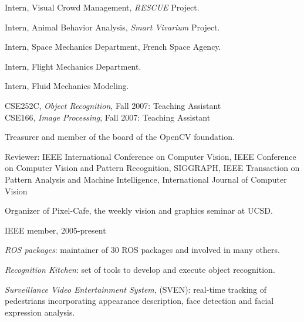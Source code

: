 \begin{llist}
Intern, Visual Crowd Management, {\em RESCUE} Project.

Intern, Animal Behavior Analysis, {\em Smart Vivarium} Project.

Intern, Space Mechanics Department, French Space Agency.

 
Intern, Flight Mechanics Department.

 
Intern, Fluid Mechanics Modeling.

CSE252C, {\em Object Recognition}, Fall 2007: Teaching Assistant\\
CSE166, {\em Image Processing}, Fall 2007: Teaching Assistant


Treasurer and member of the board of the OpenCV foundation.

Reviewer: IEEE International Conference on Computer Vision, IEEE Conference on Computer Vision and Pattern Recognition, 
SIGGRAPH, IEEE Transaction on Pattern Analysis and Machine Intelligence, International Journal of Computer Vision

Organizer of Pixel-Cafe, the weekly vision and graphics seminar at UCSD.

IEEE member, 2005-present





{\em ROS packages}: maintainer of 30 ROS packages and involved in many others.

{\em Recognition Kitchen}: set of tools to develop and execute object recognition.

{\em Surveillance Video Entertainment System}, (SVEN): real-time tracking of pedestrians incorporating appearance 
description, face detection and facial expression analysis.


\end{llist}
